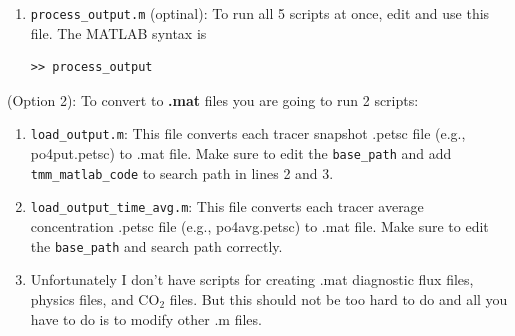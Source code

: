 \documentclass[a4paper]{article}
\def\noin{\noindent }
\begin{document}
\begin{enumerate}
\item\verb|process_output.m| (optinal): To run all 5 scripts at once, edit and use this file. The MATLAB syntax is 
\begin{lstlisting}[style=DOS]
 >> process_output
\end{lstlisting}

\end{enumerate}

\noin (Option 2): To convert to \textbf{.mat} files you are going to run 2 scripts:
\begin{enumerate}

\item \verb|load_output.m|: This file converts each tracer snapshot .petsc file (e.g., po4put.petsc) to .mat file. Make sure to edit the \verb|base_path| and add \verb|tmm_matlab_code| to search path in lines 2 and 3.
\item \verb|load_output_time_avg.m|: This file converts each tracer average concentration .petsc file (e.g., po4avg.petsc) to .mat file. Make sure to edit the \verb|base_path| and search path correctly.
\item Unfortunately I don't have scripts for creating .mat diagnostic flux files, physics files, and $\mathrm{CO_{2}}$ files. But this should not be too hard to do and all you have to do is to modify other .m files.

\end{enumerate}
\end{document}
